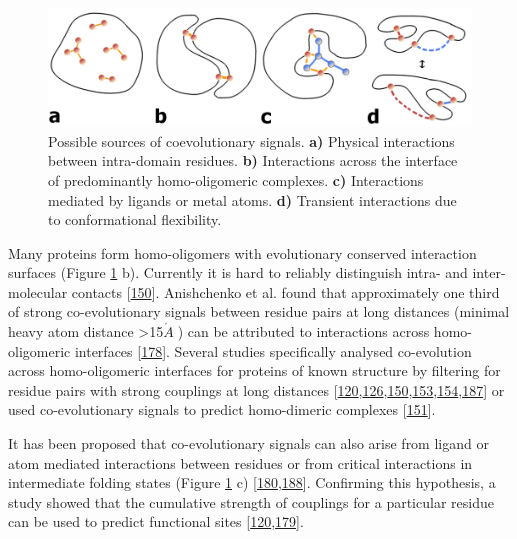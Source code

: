 \documentclass[11pt,a4paper,twoside]{book}
\newcommand{\angstrom}{\mathring{A} \;}
\theoremstyle{definition}
\theoremstyle{definition}
\theoremstyle{remark}
\begin{document}
\begin{figure}

{\centering \includegraphics[width=0.9\linewidth]{img/intro/sources_of_coevolution} 

}

\caption{Possible sources of coevolutionary
signals. \textbf{a)} Physical interactions between intra-domain
residues. \textbf{b)} Interactions across the interface of predominantly
homo-oligomeric complexes. \textbf{c)} Interactions mediated by ligands
or metal atoms. \textbf{d)} Transient interactions due to conformational
flexibility.}\label{fig:sources-coevolution}
\end{figure}

Many proteins form homo-oligomers with evolutionary conserved
interaction surfaces (Figure \ref{fig:sources-coevolution} b). Currently
it is hard to reliably distinguish intra- and inter-molecular contacts
{[}\protect\hyperlink{ref-Uguzzoni2017}{150}{]}. Anishchenko et al.
found that approximately one third of strong co-evolutionary signals
between residue pairs at long distances (minimal heavy atom distance
\textgreater{}15\(\angstrom\)) can be attributed to interactions across
homo-oligomeric interfaces
{[}\protect\hyperlink{ref-Anishchenko2017}{178}{]}. Several studies
specifically analysed co-evolution across homo-oligomeric interfaces for
proteins of known structure by filtering for residue pairs with strong
couplings at long distances
{[}\protect\hyperlink{ref-Hopf2012}{120},\protect\hyperlink{ref-Wang2015}{126},\protect\hyperlink{ref-Uguzzoni2017}{150},\protect\hyperlink{ref-Sutto2015}{153},\protect\hyperlink{ref-Jana2014}{154},\protect\hyperlink{ref-Lee2009}{187}{]}
or used co-evolutionary signals to predict homo-dimeric complexes
{[}\protect\hyperlink{ref-DosSantos2015a}{151}{]}.

It has been proposed that co-evolutionary signals can also arise from
ligand or atom mediated interactions between residues or from critical
interactions in intermediate folding states (Figure
\ref{fig:sources-coevolution} c)
{[}\protect\hyperlink{ref-Buslje2009}{180},\protect\hyperlink{ref-Ovchinnikov2015b}{188}{]}.
Confirming this hypothesis, a study showed that the cumulative strength
of couplings for a particular residue can be used to predict functional
sites
{[}\protect\hyperlink{ref-Hopf2012}{120},\protect\hyperlink{ref-Marks2012}{179}{]}.
\end{document}
